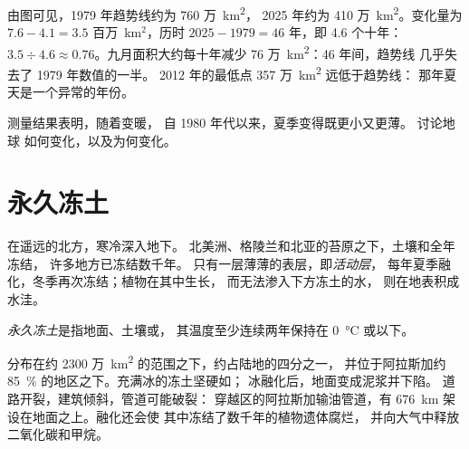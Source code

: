 \begin{example}[北极九月的海冰]
由图可见，1979 年趋势线约为 760 万~\unit{km^2}，
2025 年约为 410 万~\unit{km^2}。变化量为 $7.6 - 4.1 =
3.5$ 百万~km$^2$，历时 $2025 - 1979 = 46$ 年，即 4.6 个十年：
$3.5 \div 4.6 \approx 0.76$。九月面积大约每十年减少
76 万~\unit{km^2}：46 年间，趋势线
几乎失去了 1979 年数值的一半。
2012 年的最低点 357 万~\unit{km^2} 远低于趋势线：
那年夏天是一个异常的年份。
\end{example}

测量结果表明，随着变暖，
自 1980 年代以来，夏季变得既更小又更薄。
 讨论地球
如何变化，以及为何变化。

\section{永久冻土}

在遥远的北方，寒冷深入地下。
北美洲、格陵兰和北亚的苔原之下，土壤和全年冻结，
许多地方已冻结数千年。
只有一层薄薄的表层，即\emph{活动层}，
每年夏季融化，冬季再次冻结；植物在其中生长，
而无法渗入下方冻土的水，
则在地表积成水洼。

\begin{definition}[永久冻土]\label{def:g8:ice-on-earth:permafrost}
\emph{永久冻土}是指地面、土壤或，
其温度至少连续两年保持在 \qty{0}{\degreeCelsius} 或以下。
\end{definition}

分布在约 2300 万~\unit{km^2} 的范围之下，约占陆地的四分之一，
并位于阿拉斯加约 85~\% 的地区之下。充满冰的冻土坚硬如；
冰融化后，地面变成泥浆并下陷。
道路开裂，建筑倾斜，管道可能破裂：
穿越区的阿拉斯加输油管道，有
\qty{676}{km} 架设在地面之上。融化还会使
其中冻结了数千年的植物遗体腐烂，
并向大气中释放二氧化碳和甲烷。

